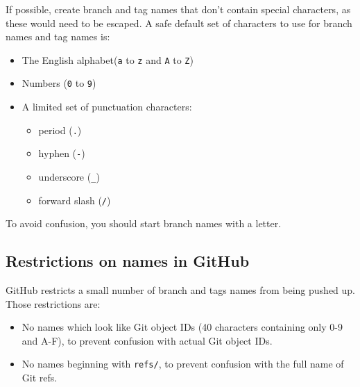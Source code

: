 If possible, create branch and tag names that don't contain special characters, as these would need to be escaped. A safe default set of characters to use for branch names and tag names is:
\begin{itemize}
    \item The English alphabet(\texttt{a} to \texttt{z} and \texttt{A} to \texttt{Z})
    \item Numbers (\texttt{0} to \texttt{9})
    \item A limited set of punctuation characters:
    \begin{itemize}
        \item period (\texttt{.})
        \item hyphen (\texttt{-})
        \item underscore (\texttt{\_})
        \item forward slash (\texttt{/})
    \end{itemize}
\end{itemize}
To avoid confusion, you should start branch names with a letter.

\subsection{Restrictions on names in GitHub}

GitHub restricts a small number of branch and tags names from being pushed up. Those restrictions are:
\begin{itemize}
    \item No names which look like Git object IDs (40 characters containing only 0-9 and A-F), to prevent confusion with actual Git object IDs.
    \item No names beginning with \texttt{refs/}, to prevent confusion with the full name of Git refs. 
\end{itemize}

